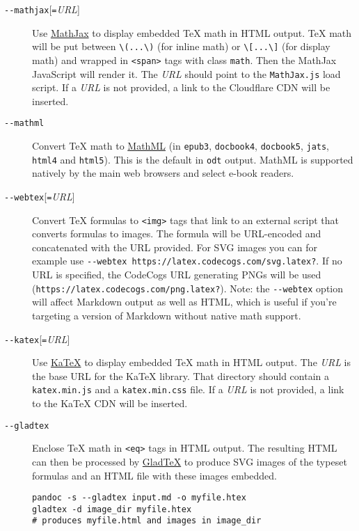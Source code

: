 \documentclass[
  a4paper,
]{article}
\begin{document}
\begin{description}
\item[\texttt{-\/-mathjax}{[}\texttt{=}\emph{URL}{]}]
Use \href{https://www.mathjax.org}{MathJax} to display embedded TeX math
in HTML output. TeX math will be put between
\texttt{\textbackslash{}(...\textbackslash{})} (for inline math) or
\texttt{\textbackslash{}{[}...\textbackslash{}{]}} (for display math)
and wrapped in \texttt{\textless{}span\textgreater{}} tags with class
\texttt{math}. Then the MathJax JavaScript will render it. The
\emph{URL} should point to the \texttt{MathJax.js} load script. If a
\emph{URL} is not provided, a link to the Cloudflare CDN will be
inserted.
\item[\texttt{-\/-mathml}]
Convert TeX math to \href{https://www.w3.org/Math/}{MathML} (in
\texttt{epub3}, \texttt{docbook4}, \texttt{docbook5}, \texttt{jats},
\texttt{html4} and \texttt{html5}). This is the default in \texttt{odt}
output. MathML is supported natively by the main web browsers and select
e-book readers.
\item[\texttt{-\/-webtex}{[}\texttt{=}\emph{URL}{]}]
Convert TeX formulas to \texttt{\textless{}img\textgreater{}} tags that
link to an external script that converts formulas to images. The formula
will be URL-encoded and concatenated with the URL provided. For SVG
images you can for example use
\texttt{-\/-webtex\ https://latex.codecogs.com/svg.latex?}. If no URL is
specified, the CodeCogs URL generating PNGs will be used
(\texttt{https://latex.codecogs.com/png.latex?}). Note: the
\texttt{-\/-webtex} option will affect Markdown output as well as HTML,
which is useful if you're targeting a version of Markdown without native
math support.
\item[\texttt{-\/-katex}{[}\texttt{=}\emph{URL}{]}]
Use \href{https://github.com/Khan/KaTeX}{KaTeX} to display embedded TeX
math in HTML output. The \emph{URL} is the base URL for the KaTeX
library. That directory should contain a \texttt{katex.min.js} and a
\texttt{katex.min.css} file. If a \emph{URL} is not provided, a link to
the KaTeX CDN will be inserted.
\item[\texttt{-\/-gladtex}]
Enclose TeX math in \texttt{\textless{}eq\textgreater{}} tags in HTML
output. The resulting HTML can then be processed by
\href{https://humenda.github.io/GladTeX/}{GladTeX} to produce SVG images
of the typeset formulas and an HTML file with these images embedded.

\begin{verbatim}
pandoc -s --gladtex input.md -o myfile.htex
gladtex -d image_dir myfile.htex
# produces myfile.html and images in image_dir
\end{verbatim}
\end{description}
\end{document}
